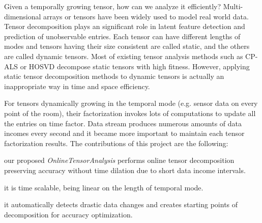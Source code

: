 
Given a temporally growing tensor, how can we analyze it efficiently? Multi-dimensional arrays or tensors have been widely used to model real world data. Tensor decomposition plays an significant role in latent feature detection and prediction of unobservable entries. Each tensor can have different lengths of modes and tensors having their size consistent are called static, and the others are called dynamic tensors. Most of existing tensor analysis methods such as CP-ALS or HOSVD decompose static tensors with high fitness. However, applying static tensor decomposition methods to dynamic tensors is actually an inappropriate way in time and space efficiency.

For tensors dynamically growing in the temporal mode (e.g. sensor data on every point of the room), their factorization invokes lots of computations to update all the entries on time factor. Data stream produces numerous amounts of data incomes every second and it became more important to maintain each tensor factorization results. The contributions of this project are the following:
\bit
\item our proposed {\em OnlineTensorAnalysis} performs online tensor decomposition preserving accuracy without time dilation due to short data income intervals.
\item it is time scalable, being linear on the length of temporal mode. 
\item it automatically detects drastic data changes and creates starting points of decomposition for accuracy optimization.
\eit